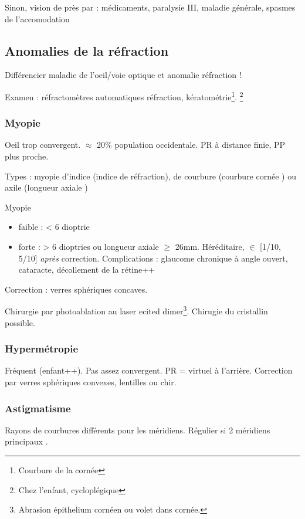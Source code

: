 \documentclass[11pt]{article}
\begin{document}
Sinon, \dec vision de près par : médicaments, paralysie III, maladie générale,
spasmes de l'accomodation

\subsection{Anomalies de la réfraction}
\label{sec:orgfaf35bc}
Différencier maladie de l'oeil/voie optique et anomalie réfraction !

Examen : réfractomètres automatiques \thus réfraction, kératométrie\footnote{Courbure de la cornée}. \footnote{Chez l'enfant, cycloplégique}

\subsubsection{Myopie}
\label{sec:org32dc9c2}
Oeil trop convergent. \(\approx\) 20\% population occidentale. PR à distance finie,
PP plus proche.

Types : myopie d'indice (\inc indice de réfraction), de courbure (courbure
cornée \inc) ou axile (longueur axiale \inc)

Myopie
\begin{itemize}
\item faible : < 6 dioptrie
\item forte : > 6 dioptries ou longueur axiale \(\ge\) 26mm. Héréditaire, \(\in\) [1/10,
5/10] \emph{après} correction. Complications : glaucome chronique à angle ouvert,
cataracte, décollement de la rétine++
\end{itemize}

Correction : verres sphériques concaves.

Chirurgie par photoablation au laser ecited dimer\footnote{Abrasion épithelium cornéen ou volet dans cornée.}. Chirugie du cristallin
possible.

\subsubsection{Hypermétropie}
\label{sec:orgd9eba6a}
Fréquent (enfant++). Pas assez convergent. PR = virtuel à l'arrière. Correction
par verres sphériques convexes, lentilles ou chir.

\subsubsection{Astigmatisme}
\label{sec:orgeb424c4}
Rayons de courbures différents pour les méridiens. Régulier si 2 méridiens
principaux \bot.
\end{document}
